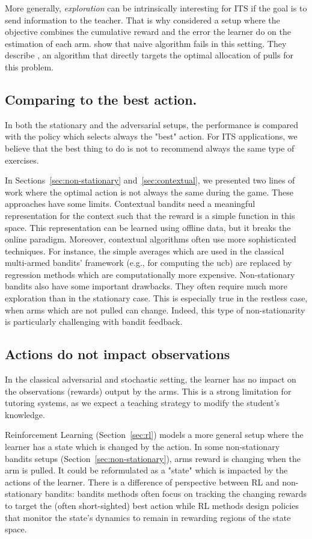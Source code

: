 More generally, \emph{exploration} can be intrinsically interesting for ITS if the goal is to send information to the teacher. That is why \citet{liu2014trading, erraqabi2017trading} considered a setup where the objective combines the cumulative reward and the error the learner do on the estimation of each arm. \citet{erraqabi2017trading} show that naive \UCB algorithm fails in this setting. They describe \ForcingBalance, an algorithm that directly targets the optimal allocation of pulls for this problem. 


\subsection{Comparing to the best action.}
In both the stationary and the adversarial setups, the performance is compared with the policy which selects always the "best" action. For ITS applications, we believe that the best thing to do is not to recommend always the same type of exercises. 

In Sections~\ref{sec:non-stationary} and~\ref{sec:contextual}, we presented two lines of work where the optimal action is not always the same during the game. These approaches have some limits. Contextual bandits need a meaningful representation for the context such that the reward is a simple function in this space. This representation can be learned using offline data, but it breaks the online paradigm. Moreover, contextual algorithms often use more sophisticated techniques. For instance, the simple averages which are used in the classical multi-armed bandits' framework (e.g., for computing the ucb) are replaced by regression methods which are computationally more expensive. Non-stationary bandits also have some important drawbacks. They often require much more exploration than in the stationary case. This is especially true in the restless case, when arms which are not pulled can change. Indeed, this type of non-stationarity is particularly challenging with bandit feedback. 

\subsection{Actions do not impact observations}
In the classical adversarial and stochastic setting, the learner has no impact on the observations (rewards) output by the arms. This is a strong limitation for tutoring systems, as we expect a teaching strategy to modify the student's knowledge. 

Reinforcement Learning (Section~\ref{sec:rl}) models a more general setup where the learner has a state which is changed by the action. In some non-stationary bandits setups (Section~\ref{sec:non-stationary}), arms reward is changing when the arm is pulled. It could be reformulated as a "state" which is impacted by the actions of the learner. There is a difference of perspective between RL and non-stationary bandits: bandits methods often focus on tracking the changing rewards to target the (often short-sighted) best action while RL methods design policies that monitor the state's dynamics to remain in rewarding regions of the state space. 

